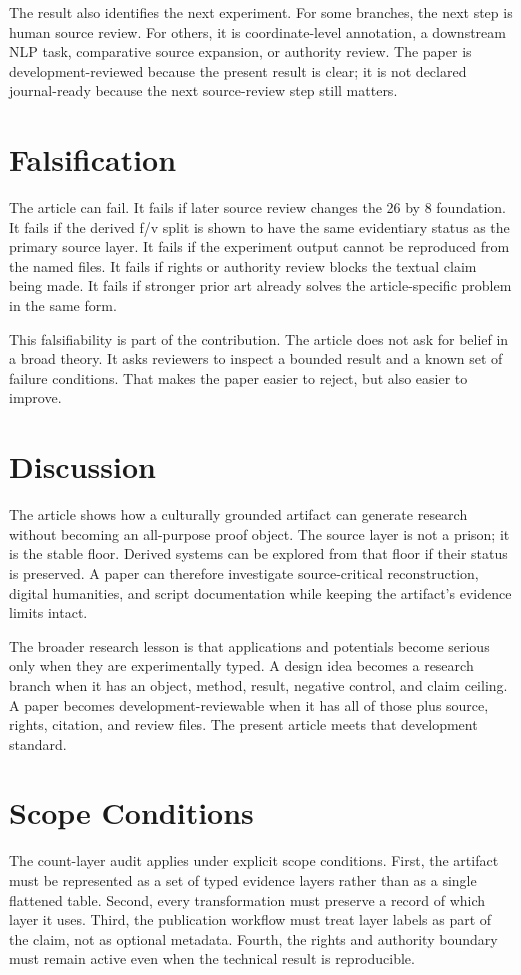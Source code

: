 \documentclass[sigconf,nonacm]{acmart}
\begin{document}
The result also identifies the next experiment. For some branches, the next step
is human source review. For others, it is coordinate-level annotation, a
downstream NLP task, comparative source expansion, or authority review. The
paper is development-reviewed because the present result is clear; it is not
declared journal-ready because the next source-review step still matters.

\section{Falsification}
The article can fail. It fails if later source review changes the 26 by 8
foundation. It fails if the derived f/v split is shown to have the same
evidentiary status as the primary source layer. It fails if the experiment output
cannot be reproduced from the named files. It fails if rights or authority review
blocks the textual claim being made. It fails if stronger prior art already
solves the article-specific problem in the same form.

This falsifiability is part of the contribution. The article does not ask for
belief in a broad theory. It asks reviewers to inspect a bounded result and a
known set of failure conditions. That makes the paper easier to reject, but also
easier to improve.

\section{Discussion}
The article shows how a culturally grounded artifact can generate research
without becoming an all-purpose proof object. The source layer is not a prison;
it is the stable floor. Derived systems can be explored from that floor if their
status is preserved. A paper can therefore investigate source-critical reconstruction, digital humanities, and script documentation while keeping the
artifact's evidence limits intact.

The broader research lesson is that applications and potentials become serious
only when they are experimentally typed. A design idea becomes a research branch
when it has an object, method, result, negative control, and claim ceiling. A
paper becomes development-reviewable when it has all of those plus source,
rights, citation, and review files. The present article meets that development
standard.


\section{Scope Conditions}
The count-layer audit applies under explicit scope conditions. First, the artifact must be
represented as a set of typed evidence layers rather than as a single flattened
table. Second, every transformation must preserve a record of which layer it
uses. Third, the publication workflow must treat layer labels as part of the
claim, not as optional metadata. Fourth, the rights and authority boundary must
remain active even when the technical result is reproducible.
\end{document}
